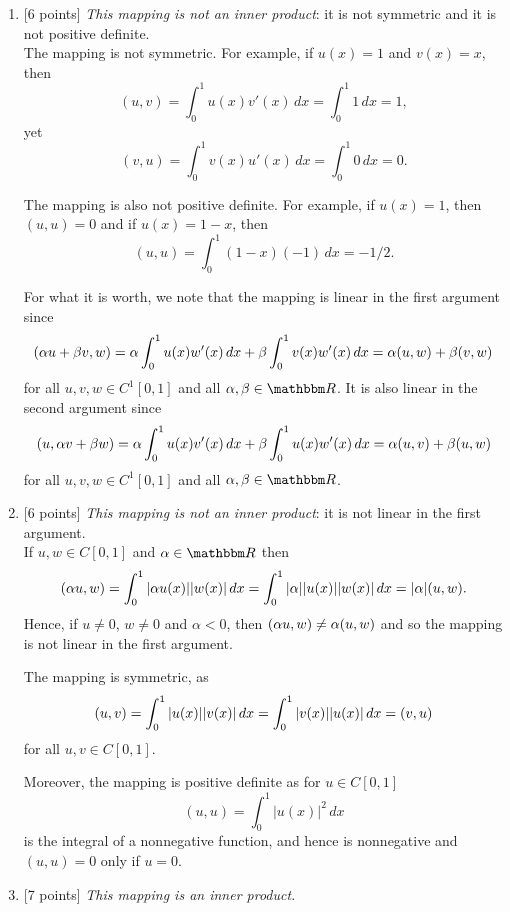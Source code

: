 \begin{solution}
\begin{enumerate}
\item {[6 points]} \emph{This mapping is not an inner product}:
      it is not symmetric and it is not positive definite.\\

      The mapping is not symmetric.
       For example, if $u(x) = 1$ and $v(x) = x$, then
         \[ (u,v) = \int_0^1 u(x) v'(x) \, dx = \int_0^1 1\, dx = 1,\]
       yet
         \[ (v,u) = \int_0^1 v(x) u'(x) \, dx = \int_0^1 0\, dx = 0.\]

       The mapping is also not positive definite.
       For example, if $u(x) = 1$, then $(u,u) = 0$ and if $u(x) = 1-x$,
       then
         \[ (u,u) = \int_0^1 (1-x)(-1)\, dx = -1/2.\]
       
For what it is worth, we note that the mapping is linear in the first argument since
         \[ (\alpha u + \beta v, w)
                = \alpha \int_0^1 u(x) w'(x) \,dx + \beta\int_0^1 v(x) w'(x)\,dx
                = \alpha(u,w) + \beta(v,w) \]
for all $u,v,w\in C^1[0,1]$ and all $\alpha,\beta\in\R$. It is also linear in the second argument since
         \[ (u,\alpha v+\beta w)
                = \alpha \int_0^1 u(x) v'(x) \,dx + \beta\int_0^1 u(x) w'(x)\,dx
                = \alpha(u,v) + \beta(u,w) \]
for all $u,v,w\in C^1[0,1]$ and all $\alpha,\beta\in\R$.

\item {[6 points]} \emph{This mapping is not an inner product}: it is not linear in the first argument.\\

If $u,w\in C[0,1]$ and $\alpha\in\R$ then
     \[ (\alpha u,w) = \int_0^1 |\alpha u(x)| |w(x)|\, d x
                 =  \int_0^1 |\alpha| |u(x)| |w(x)| \, d x = |\alpha| (u,w).\]  
Hence, if $u\ne 0$, $w\ne 0$ and $\alpha<0$, then $(\alpha u, w) \ne \alpha (u,w)$ and so the mapping is not linear in the first argument.

The mapping is symmetric, as 
     \[ (u,v) = \int_0^1 |u(x)| |v(x)|\, d x
                 =  \int_0^1 |v(x)| |u(x)| \, d x = (v,u)\]
for all $u,v\in C[0,1]$.

Moreover, the mapping is positive definite as for $u\in C[0,1]$
             \[ (u,u) = \int_0^1 |u(x)|^2\, dx\]
      is the integral of a nonnegative function, and hence is nonnegative and
      $(u,u)=0$ only if $u=0$.
     
\item {[7 points]} \emph{This mapping is an inner product.}\\


\end{enumerate}
\end{solution}
